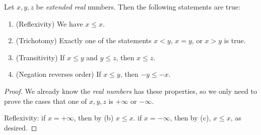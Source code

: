 \begin{proposition} \label{prop 6.2.5}
Let \(x, y, z\) be \emph{extended real} numbers.
Then the following statements are true:
\begin{enumerate}
    \item (Reflexivity) We have \(x \le x\).
    \item (Trichotomy) Exactly one of the statements \(x < y\), \(x = y\), or \(x > y\) is true.
    \item (Transitivity) If \(x \le y\) and \(y \le z\), then \(x \le z\).
    \item (Negation reverses order) If \(x \le y\), then \(-y \le -x\).
\end{enumerate}
\end{proposition}

\begin{proof}
We already know the \emph{real numbers} has these properties, so we only need to prove the cases that one of \(x, y, z\) is \(+\infty\) or \(-\infty\).

Reflexivity: if \(x = +\infty\), then by (b) \(x \le x\). if \(x = -\infty\), then by (c), \(x \le x\), as desired.


\end{proof}
